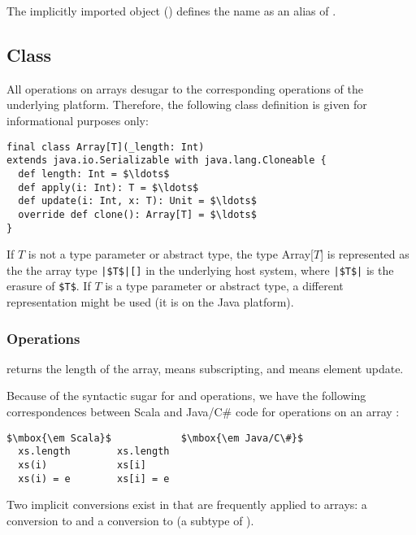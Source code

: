 The implicitly imported  object () defines the name 
 as an alias of .

\subsection{Class \large{}}\label{cls:array}

All operations on arrays desugar to the corresponding operations of the
underlying platform. Therefore, the following class definition is given for
informational purposes only:

\begin{lstlisting}
final class Array[T](_length: Int)
extends java.io.Serializable with java.lang.Cloneable {
  def length: Int = $\ldots$
  def apply(i: Int): T = $\ldots$
  def update(i: Int, x: T): Unit = $\ldots$
  override def clone(): Array[T] = $\ldots$
}
\end{lstlisting}

If $T$ is not a type parameter or abstract type, the type Array[$T$]
is represented as the the array type \lstinline{|$T$|[]} in the
underlying host system, where \lstinline{|$T$|} is the erasure of \lstinline{$T$}.
If $T$ is a type parameter or abstract type, a different representation might be
used (it is  on the Java platform).

\subsubsection{Operations}

 returns the length of the array,  means subscripting,
and  means element update.

Because of the syntactic sugar for  and  operations,
we have the following correspondences between Scala and Java/C\# code for
operations on an array :

\begin{lstlisting}
$\mbox{\em Scala}$            $\mbox{\em Java/C\#}$
  xs.length        xs.length
  xs(i)            xs[i]
  xs(i) = e        xs[i] = e
\end{lstlisting}

Two implicit conversions exist in  that are frequently applied to arrays:
a conversion to  and a conversion to
 (a subtype of ).

